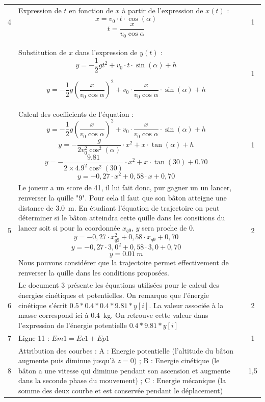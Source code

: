 \documentclass[a4paper,11pt,fleqn]{article}%
\begin{document}
\begin{longtable}{|c|m{.7\linewidth}|c|c|}
    4 & Expression de $t$ en fonction de $x$ à partir de l'expression de $x(t)$ :
    $$ x = v_0 \cdot t \cdot \cos(\alpha)$$
    $$ t = \dfrac{x}{v_0 \cos{\alpha}}$$
    & & 1 \\
    & Substitution de $x$ dans l'expression de $y(t)$ :
    $$ y = -\frac{1}{2}gt^2  + v_0 \cdot t \cdot \sin(\alpha)+ h$$

    $$ y = -\frac{1}{2}g\left(\dfrac{x}{v_0 \cos{\alpha}}\right)^2  + v_0 \cdot \dfrac{x}{v_0 \cos{\alpha}} \cdot \sin(\alpha)+ h$$
    & & 1\\
    
    & Calcul des coefficients de l'équation : 
    $$ y = -\frac{1}{2}g\left(\dfrac{x}{v_0 \cos{\alpha}}\right)^2  + v_0 \cdot \dfrac{x}{v_0 \cos{\alpha}} \cdot \sin(\alpha)+ h$$
    $$ y = -\dfrac{g}{2v_0^2 \cos^2{(\alpha)}}  \cdot x^2+  x\cdot \tan(\alpha)+ h$$
    $$ y = -\dfrac{\num{9.81}}{2\times \num{4.9}^2 \cos^2{(30)}}  \cdot x^2+  x\cdot \tan(30)+ \num{0,70}$$
    $$y  = -0,27 \cdot x^2 + 0,58 \cdot x + 0,70$$
    & & 1\\
    \hline

    5 & Le joueur a un score de 41, il lui fait donc, pur gagner un un lancer, renverser la quille "9". Pour cela il faut que son bâton atteigne une distance de \SI{3,0}{m}. En étudiant l'équation de trajectoire on peut déterminer si le bâton atteindra cette quille dans les consitions du lancer soit si pour la coordonnée $x_{q9}$, $y$ sera proche de $0$.
    $$y  = -0,27 \cdot x_{q9}^2 + 0,58 \cdot x_{q9} + 0,70$$
    $$y  = -0,27 \cdot 3,0^2 + 0,58 \cdot 3,0 + 0,70$$
    $$ y = \SI{0,01}{m}$$
    Nous pouvons considérer que la trajectoire permet effectivement de renverser la quille dans les conditions proposées.
    & & 2\\
    \hline
    6 & Le document 3 présente les équations utilisées pour le calcul des énergies cinétiques et potentielles. On remarque que l'énergie cinétique s'écrit $0.5 * 0.4 *0.4 * 9.81 * y[i]$. La valeur associée à la masse correspond ici à \SI{0,4}{kg}. On retrouve cette valeur dans l'expression de l'énergie potentielle $0.4 * 9.81 * y[i]$
    & & 2\\
    \hline

    7& Ligne 11 : $ Em1 = Ec1 + Ep1$ 
    & & 1\\
    \hline

    8 & Attribution des courbes : A : Energie potentielle (l'altitude du bâton augmente puis diminue jusqu'à $z=0$) ; B : Energie cinétique (le bâton a une vitesse qui diminue pendant son ascension et augmente dans la seconde phase du mouvement) ; C : Energie mécanique (la somme des deux courbe et est conservée pendant le déplacement)
    & & 1,5\\
    \hline


\end{longtable}
\end{document}
